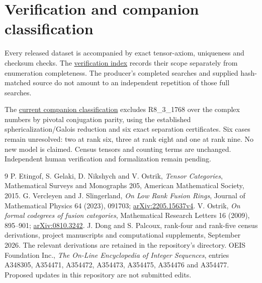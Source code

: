 \documentclass[11pt,a4paper]{article}
\theoremstyle{definition}\newtheorem{definition}[theorem]{Definition}\newtheorem{remark}[theorem]{Remark}
\begin{document}
\section{Verification and companion classification}

Every released dataset is accompanied by exact tensor-axiom, uniqueness and
checksum checks. The \href{https://github.com/sebastienpalcoux/fusion-ring-census/blob/main/verification/README.md}{verification index}
records their scope separately from enumeration completeness. The producer's
completed searches and supplied hash-matched source do not amount to an
independent repetition of those full searches.

The \href{https://github.com/sebastienpalcoux/grothendieck-ring-classification/blob/main/evidence/frontier/README.md}{current companion classification}
excludes R8\_3\_1768 over the complex numbers by pivotal conjugation parity,
using the established sphericalization/Galois reduction and six exact
separation certificates. Six cases remain unresolved: two at rank six, three at rank eight and one at rank nine. No new model is claimed. Census
tensors and counting terms are unchanged. Independent human verification
and formalization remain pending.

\begin{thebibliography}{9}\small\setlength{\itemsep}{2pt}
 P. Etingof, S. Gelaki, D. Nikshych and V. Ostrik,
\emph{Tensor Categories}, Mathematical Surveys and Monographs 205,
American Mathematical Society, 2015.
 G. Vercleyen and J. Slingerland,
\emph{On Low Rank Fusion Rings}, Journal of Mathematical Physics 64 (2023),
091703; \href{https://arxiv.org/abs/2205.15637v4}{arXiv:2205.15637v4}.
 V. Ostrik, \emph{On formal codegrees of fusion categories},
Mathematical Research Letters 16 (2009), 895--901;
\href{https://arxiv.org/abs/0810.3242}{arXiv:0810.3242}.
 J. Dong and S. Palcoux, rank-four and rank-five census derivations,
project manuscripts and computational supplements, September 2026.
The relevant derivations are retained in the repository's  directory.
 OEIS Foundation Inc., \emph{The On-Line Encyclopedia of Integer
Sequences}, entries A348305, A354471, A354472, A354473, A354475, A354476
and A354477. Proposed updates in this repository are not submitted edits.
\end{thebibliography}
\end{document}
